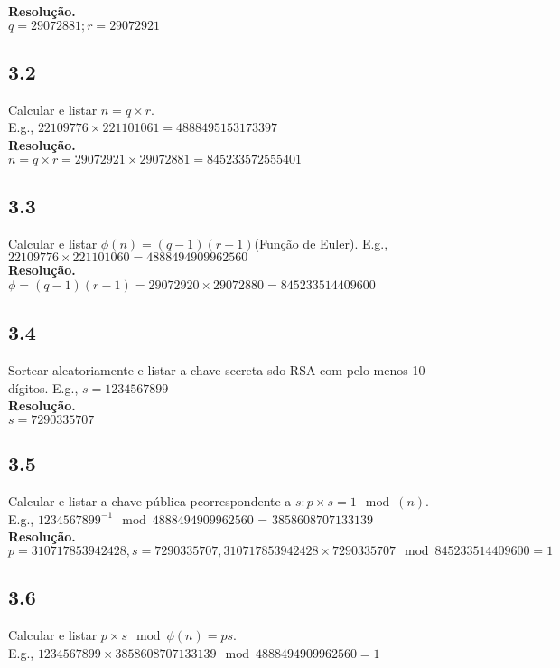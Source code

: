 \documentclass[12pt,letterpaper]{article}
\newcommand\answer{\textbf{Resolução.}\xspace}
\begin{document}
\answer \\
$q = 29072881; r = 29072921$

\subsection*{3.2}
Calcular e listar $n = q \times r$. \\
E.g., $22109776 \times 221101061 = 4888495153173397$ \\

\answer \\
$n = q \times r = 29072921 \times 29072881 = 845233572555401$

\subsection*{3.3}
Calcular e listar $\phi(n) = (q - 1)(r - 1)$(Função de Euler). E.g., $22109776 \times 221101060 = 4888494909962560$ \\

\answer \\
$\phi = (q-1)(r-1) = 29072920 \times 29072880 = 845233514409600$

\subsection*{3.4}
Sortear aleatoriamente e listar a chave secreta sdo RSA com pelo menos 10 dígitos. E.g., $s = 1234567899$ \\

\answer \\
$s = 7290335707$

\subsection*{3.5}
Calcular e listar a chave pública pcorrespondente a $s: p \times s = 1 \mod(n)$. \\
E.g., $1234567899^{-1} \mod 4888494909962560$ = $3858608707133139$ \\

\answer \\
$p = 310717853942428 , s = 7290335707,310717853942428 \times 7290335707 \mod 845233514409600 = 1$

\subsection*{3.6}
Calcular e listar $p \times s \mod \phi(n) = ps$.\\
E.g., $1234567899 \times 3858608707133139 \mod 4888494909962560 = 1$ \\
\end{document}
